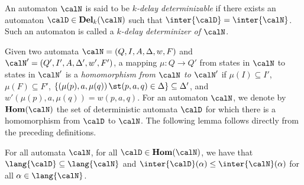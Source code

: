 \documentclass[a4paper]{article}
\begin{document}
An automaton $\calN$ is said to be \emph{$k$-delay determinizable} if there
exists an automaton $\calD \in \mathbf{Del}_k(\calN)$ such that $\inter{\calD} =
\inter{\calN}$. Such an automaton is called a \emph{$k$-delay determinizer of
$\calN$}.

Given two automata $\calN = (Q,I,A,\Delta,w,F)$ and $\calN' =
(Q',I',A,\Delta',w',F')$, a mapping $\mu : Q \to Q'$ from
states in $\calN$ to states in $\calN'$ is a \emph{homomorphism from $\calN$ to
$\calN'$} if $\mu(I) \subseteq I'$, $\mu(F) \subseteq F'$, $\{
\left(\mu(p),a,\mu(q) \right) \st (p,a,q) \in \Delta\} \subseteq \Delta'$, and
$w'(\mu(p),a,\mu(q)) = w(p,a,q)$. For an automaton $\calN$, we denote by
$\mathbf{Hom}(\calN)$ the set of deterministic automata $\calD$ for which there
is a homomorphism from $\calD$ to $\calN$.
The following lemma follows directly from the
preceding definitions.
\begin{lemma}\label{lem:hom-prop}
	For all automata $\calN$, for all $\calD \in \mathbf{Hom}(\calN)$, we
	have that $\lang{\calD} \subseteq \lang{\calN}$ and
	$\inter{\calD}(\alpha) \leq \inter{\calN}(\alpha)$ for all $\alpha \in
	\lang{\calN}$.
\end{lemma}
\end{document}
